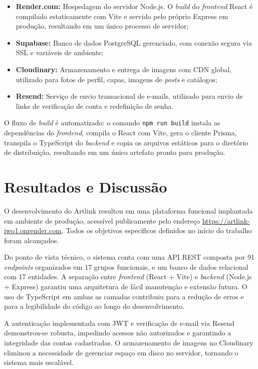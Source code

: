 \documentclass[a4paper, 12pt, oneside]{article}
\begin{document}
\begin{itemize}
    \item \textbf{Render.com:} Hospedagem do servidor Node.js. O \textit{build} do \textit{frontend} React é compilado estaticamente com Vite e servido pelo próprio Express em produção, resultando em um único processo de servidor;
    \item \textbf{Supabase:} Banco de dados PostgreSQL gerenciado, com conexão segura via SSL e variáveis de ambiente;
    \item \textbf{Cloudinary:} Armazenamento e entrega de imagens com CDN global, utilizado para fotos de perfil, capas, imagens de \textit{posts} e catálogos;
    \item \textbf{Resend:} Serviço de envio transacional de e-mails, utilizado para envio de links de verificação de conta e redefinição de senha.
\end{itemize}

O fluxo de \textit{build} é automatizado: o comando \texttt{npm run build} instala as dependências do \textit{frontend}, compila o React com Vite, gera o cliente Prisma, transpila o TypeScript do \textit{backend} e copia os arquivos estáticos para o diretório de distribuição, resultando em um único artefato pronto para produção.

\section{Resultados e Discussão}

O desenvolvimento do Artlink resultou em uma plataforma funcional implantada em ambiente de produção, acessível publicamente pelo endereço \url{https://artlink-iwq1.onrender.com}. Todos os objetivos específicos definidos no início do trabalho foram alcançados.

Do ponto de vista técnico, o sistema conta com uma API REST composta por 91 \textit{endpoints} organizados em 17 grupos funcionais, e um banco de dados relacional com 17 entidades. A separação entre \textit{frontend} (React + Vite) e \textit{backend} (Node.js + Express) garantiu uma arquitetura de fácil manutenção e extensão futura. O uso de TypeScript em ambas as camadas contribuiu para a redução de erros e para a legibilidade do código ao longo do desenvolvimento.

A autenticação implementada com JWT e verificação de e-mail via Resend demonstrou-se robusta, impedindo acessos não autorizados e garantindo a integridade das contas cadastradas. O armazenamento de imagens no Cloudinary eliminou a necessidade de gerenciar espaço em disco no servidor, tornando o sistema mais escalável.
\end{document}
